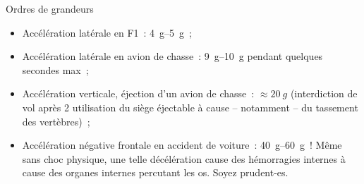 \documentclass[a4paper, 12pt, final, garamond]{book}
\begin{document}
\begin{brema}{Ordres de grandeurs}
    \begin{itemize}[label=$\diamond$]
        \item Accélération latérale en F1~: \SIrange{4}{5}{g}~;
        \item Accélération latérale en avion de chasse~: \SIrange{9}{10}{g}
            pendant quelques secondes max~;
        \item Accélération verticale, éjection d'un avion de chasse~: $\approx
            \SI{20}{g}$ (interdiction de vol après 2 utilisation du siège
            éjectable à cause – notamment – du tassement des vertèbres)~;
        \item Accélération négative frontale en accident de voiture~:
            \SIrange{40}{60}{g}~! Même sans choc physique, une telle
            décélération cause des hémorragies internes à cause des organes
            internes percutant les os. Soyez prudent-es.
    \end{itemize}
\end{brema}
\end{document}
